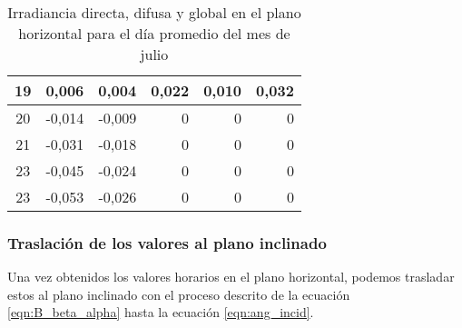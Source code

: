 \begin{table}[H]
\begin{tabular}{|c|r|r|r|r|r|}
19 & 0,006  & 0,004  & 0,022 & 0,010 & 0,032 \\ \hline
20 & -0,014 & -0,009 & 0     & 0     & 0     \\ \hline
21 & -0,031 & -0,018 & 0     & 0     & 0     \\ \hline
23 & -0,045 & -0,024 & 0     & 0     & 0     \\ \hline
23 & -0,053 & -0,026 & 0     & 0     & 0     \\ \hline
\end{tabular}
\caption{Irradiancia directa, difusa y global en el plano horizontal para el día promedio del mes de julio \label{tab:hourly_horizontal_values}}
\end{table}

\subsubsection{Traslación de los valores al plano inclinado}

Una vez obtenidos los valores horarios en el plano horizontal, podemos trasladar estos al plano inclinado con el proceso descrito de la ecuación \ref{eqn:B_beta_alpha} hasta la ecuación \ref{eqn:ang_incid}.

